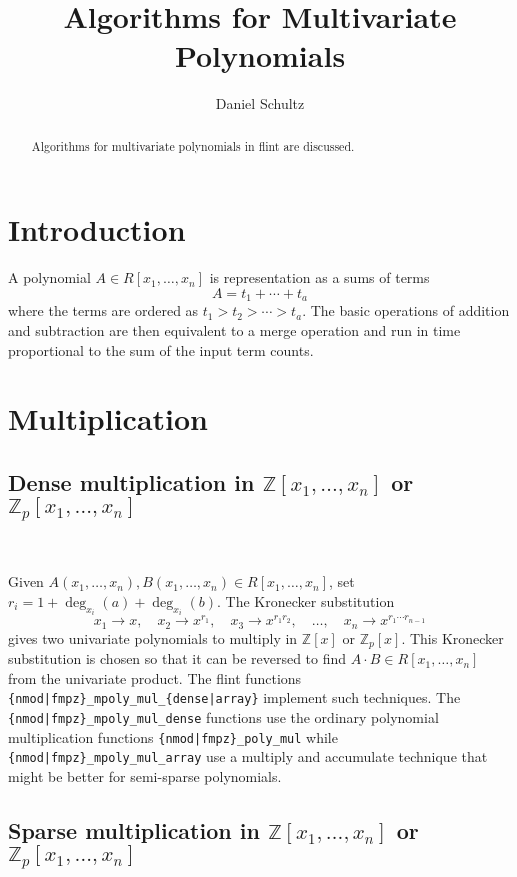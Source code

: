 \documentclass[12pt,reqno]{amsart}
\title{Algorithms for Multivariate Polynomials}
\author{Daniel Schultz}
\numberwithin{equation}{section}
\newcommand{\op}[1]  { \operatorname{ #1 }}
\newcommand{\bbZ}[0]  { \mathbb{Z}}
\begin{document}
\begin{abstract}
Algorithms for multivariate polynomials in flint are discussed.
\end{abstract}


\maketitle

\section{Introduction}

A polynomial $A \in R[x_1,\dots,x_n]$ is representation as a sums of terms
\begin{equation*}
A = t_1 + \cdots + t_a
\end{equation*}
where the terms are ordered as $t_1 > t_2 > \cdots > t_a$. The basic operations of addition and subtraction are then equivalent to a merge operation and run in time proportional to the sum of the input term counts.


\section{Multiplication}
\subsection{Dense multiplication in $\bbZ[x_1,\dots,x_n]$ or $\bbZ_p[x_1,\dots,x_n]$}\

Given $A(x_1,\dots,x_n), B(x_1,\dots,x_n) \in R[x_1,\dots,x_n]$, set $r_i = 1 + \op{deg}_{x_i}(a) + \op{deg}_{x_i}(b)$. The Kronecker substitution
\begin{equation*}
x_1 \to x, \quad x_2 \to x^{r_1}, \quad x_3 \to x^{r_1 r_2}, \quad \dots, \quad x_n \to x^{r_1 \cdots r_{n-1}}
\end{equation*}
gives two univariate polynomials to multiply in $\bbZ[x]$ or $\bbZ_p[x]$. This Kronecker substitution is chosen so that it can be reversed to find $A \cdot B \in R[x_1,\dots,x_n]$ from the univariate product. The flint functions {\tt \{nmod|fmpz\}\_mpoly\_mul\_\{dense|array\}} implement such techniques. The {\tt \{nmod|fmpz\}\_mpoly\_mul\_dense} functions use the ordinary polynomial multiplication functions {\tt \{nmod|fmpz\}\_poly\_mul} while {\tt \{nmod|fmpz\}\_mpoly\_mul\_array} use a multiply and accumulate technique that might be better for semi-sparse polynomials.


\subsection{Sparse multiplication in $\bbZ[x_1,\dots,x_n]$ or $\bbZ_p[x_1,\dots,x_n]$}\
\end{document}
